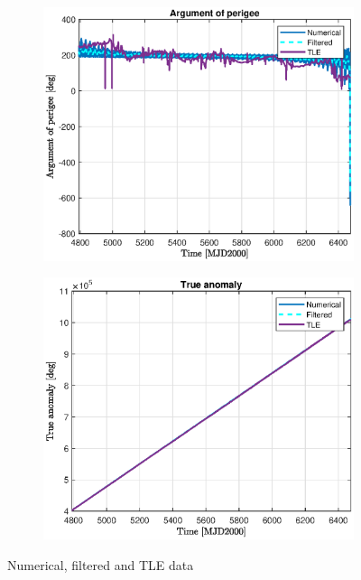 \documentclass{article}
\begin{document}
\begin{figure}[H]
	\vspace{1cm} %
	\begin{subfigure}[b]{0.45\textwidth}
		\includegraphics[width=\textwidth]{w_TLE.eps}
		\caption{}
		\label{fig:1e}
	\end{subfigure}%
	\hfill
	\begin{subfigure}[b]{0.45\textwidth}
		\includegraphics[width=\textwidth]{TA_TLE.eps}
		\caption{}
		\label{fig:1f}
	\end{subfigure}
	
	\caption{Numerical, filtered and TLE data
	}
\end{figure}
\end{document}

